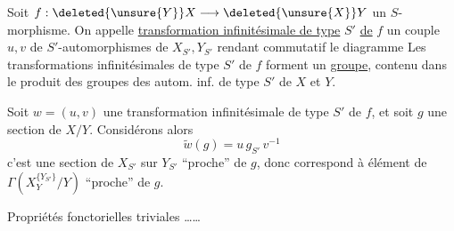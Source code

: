 Soit $f:\deleted{\unsure{Y}}X\longrightarrow\deleted{\unsure{X}}Y$ un $S$-morphisme. On appelle \uline{transformation infinitésimale de type} $S'$ \uline{de} $f$ un couple $u,v$ de $S'$-automorphismes de $X_{S'},Y_{S'}$  rendant commutatif le diagramme
Les transformations infinitésimales  de type $S'$ de $f$ forment un \uline{groupe}, contenu dans le produit des groupes des autom. inf. de type $S'$ de $X$ et $Y$.

Soit $w=(u,v)$ une transformation infinitésimale de type $S'$ de $f$, et soit $g$ une section de $X/Y$. Considérons alors
\[
\widetilde w(g)=u\,g_{S'}\,v^{-1}
\]
c'est une section de $X_{S'}$ sur $Y_{S'}$ ``proche'' de $g$, donc correspond à   élément de $\Gamma(X_Y^{\{Y_{S'}\}}/Y)$ ``proche'' de $g$.

Propriétés fonctorielles triviales \ldots\ldots

